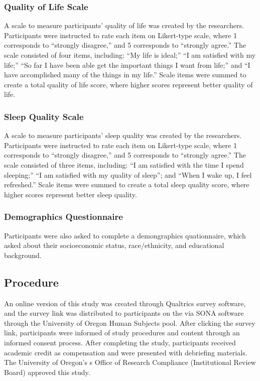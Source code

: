 \documentclass[man]{apa6}
\begin{document}
\subsubsection{Quality of Life Scale}\label{quality-of-life-scale}

A scale to measure participants' quality of life was created by the
researchers. Participants were instructed to rate each item on
Likert-type scale, where 1 corresponds to \enquote{strongly disagree,}
and 5 corresponds to \enquote{strongly agree.} The scale consisted of
four items, including: \enquote{My life is ideal;} \enquote{I am
satisfied with my life;} \enquote{So far I have been able get the
important things I want from life;} and \enquote{I have accomplished
many of the things in my life.} Scale items were summed to create a
total quality of life score, where higher scores represent better
quality of life.

\subsubsection{Sleep Quality Scale}\label{sleep-quality-scale}

A scale to measure participants' sleep quality was created by the
researchers. Participants were instructed to rate each item on
Likert-type scale, where 1 corresponds to \enquote{strongly disagree,}
and 5 corresponds to \enquote{strongly agree.} The scale consisted of
three items, including: \enquote{I am satisfied with the time I spend
sleeping;} \enquote{I am satisfied with my quality of sleep}; and
\enquote{When I wake up, I feel refreshed.} Scale items were summed to
create a total sleep quality score, where higher scores represent better
sleep quality.

\subsubsection{Demographics
Questionnaire}\label{demographics-questionnaire}

Participants were also asked to complete a demongraphics quationnaire,
which asked about their socioeconomic status, race/ethnicity, and
educational background.

\subsection{Procedure}\label{procedure}

An online version of this study was created through Qualtrics survey
software, and the survey link was distributed to participants on the via
SONA software through the University of Oregon Human Subjects pool.
After clicking the survey link, participants were informed of study
procedures and content through an informed consent process. After
completing the study, participants received academic credit as
compensation and were presented with debriefing materials. The
University of Oregon's s Office of Research Compliance (Institutional
Review Board) approved this study.
\end{document}

